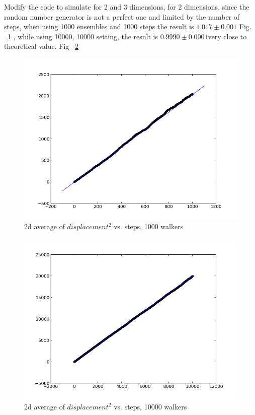 \documentclass[11pt,letterpaper]{article}
\begin{document}
Modify the code to simulate for 2 and 3 dimensions, for 2 dimensions, since the random number generator is not a perfect one and limited by the number of steps, when using 1000 ensembles and 1000 steps the result is $1.017\pm0.001$ Fig. ~\ref{figure1} , while using 10000, 10000 setting, the result is $0.9990\pm0.0001$very close to theoretical value. Fig ~\ref{figure2}


\begin{figure}
\begin{center}
\includegraphics[width=0.8\linewidth,angle=0]{p11.png}
\caption{2d average of $displacement^2$ vs. steps, 1000 walkers}
\label{figure1}
\end{center}
\end{figure}


\begin{figure}
\begin{center}
\includegraphics[width=0.8\linewidth,angle=0]{p12.png}
\caption{2d average of $displacement^2$ vs. steps, 10000 walkers}
\label{figure2}
\end{center}
\end{figure}
\end{document}
